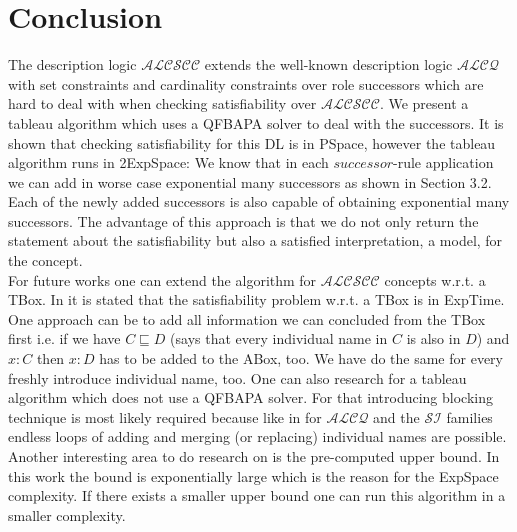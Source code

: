 \documentclass{book}
\theoremstyle{break}
\theoremstyle{definition}
\begin{document}
\chapter{Conclusion}
The description logic $\mathcal{ALCSCC}$ extends the well-known description logic $\mathcal{ALCQ}$ with set constraints and cardinality constraints over role successors which are hard to deal with when checking satisfiability over $\mathcal{ALCSCC}$. We present a tableau algorithm which uses a QFBAPA solver to deal with the successors. It is shown that checking satisfiability for this DL is in PSpace, however the tableau algorithm runs in 2ExpSpace: We know that in each $successor$-rule application we can add in worse case exponential many successors as shown in Section 3.2. Each of the newly added successors is also capable of obtaining exponential many successors. The advantage of this approach is that we do not only return the statement about the satisfiability but also a satisfied interpretation, a model, for the concept.\\
For future works one can extend the algorithm for $\mathcal{ALCSCC}$ concepts w.r.t. a TBox. In \cite{4} it is stated that the satisfiability problem w.r.t. a TBox is in ExpTime. One approach can be to add all information we can concluded from the TBox first i.e. if we have $C\sqsubseteq D$ (says that every individual name in $C$ is also in $D$) and $x:C$ then $x:D$ has to be added to the ABox, too. We have do the same for every freshly introduce individual name, too. One can also research for a tableau algorithm which does not use a QFBAPA solver. For that introducing blocking technique is most likely required because like in for $\mathcal{ALCQ}$ and the $\mathcal{SI}$ families endless loops of adding and merging (or replacing) individual names are possible. Another interesting area to do research on is the pre-computed upper bound. In this work the bound is exponentially large which is the reason for the ExpSpace complexity. If there exists a smaller upper bound one can run this algorithm in a smaller complexity.
\normalem


\end{document}
